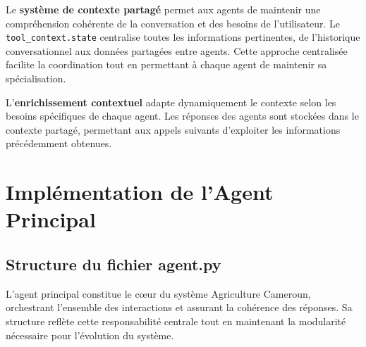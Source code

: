 Le \textbf{système de contexte partagé} permet aux agents de maintenir une compréhension cohérente de la conversation et des besoins de l'utilisateur. Le \texttt{tool\_context.state} centralise toutes les informations pertinentes, de l'historique conversationnel aux données partagées entre agents. Cette approche centralisée facilite la coordination tout en permettant à chaque agent de maintenir sa spécialisation.

L'\textbf{enrichissement contextuel} adapte dynamiquement le contexte selon les besoins spécifiques de chaque agent. Les réponses des agents sont stockées dans le contexte partagé, permettant aux appels suivants d'exploiter les informations précédemment obtenues.

\section{Implémentation de l'Agent Principal}

\subsection{Structure du fichier agent.py}

L'agent principal constitue le cœur du système Agriculture Cameroun, orchestrant l'ensemble des interactions et assurant la cohérence des réponses. Sa structure reflète cette responsabilité centrale tout en maintenant la modularité nécessaire pour l'évolution du système.

